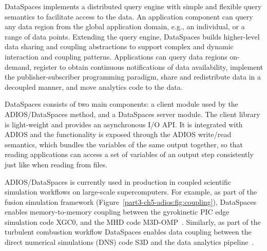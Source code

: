 DataSpaces implements a distributed query engine with simple and flexible query semantics to facilitate access to the data. An application component can query any data region from the global application domain, e.g., an individual, or a range of data points. Extending the query engine, DataSpaces builds higher-level data sharing and coupling abstractions to support complex and dynamic interaction and coupling patterns. Applications can query data regions on-demand, register to obtain continuous notifications of data availability, implement the publisher-subscriber programming paradigm, share and redistribute data in a decoupled manner, and move analytics code to the data.

DataSpaces consists of two main components: a client module used by the ADIOS/DataSpaces method, and a DataSpaces server module. The client library is light-weight and provides an asynchronous I/O API. It is integrated with ADIOS and the functionality is exposed through the ADIOS write/read semantics, which bundles the variables of the same output together, so that reading applications can access a set of variables of an output step consistently just like when reading from files.

ADIOS/DataSpaces is currently used in production in coupled scientific simulation workflows on large-scale supercomputers. For example, as part of the fusion simulation framework (Figure~\ref{part3-ch5-adios:fig:coupling}), DataSpaces enables memory-to-memory coupling between the gyrokinetic PIC edge simulation code XGC0, and the MHD code M3D-OMP~\cite{ADIOS:Docan:ccgrid10}. Similarly, as part of the turbulent combustion workflow DataSpaces enables data coupling between the direct numerical simulations (DNS) code S3D and the data analytics pipeline~\cite{ADIOS:Bennett:SC12}.

